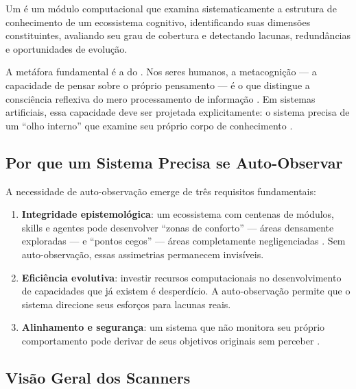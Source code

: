\begin{definicao}
Um  é um módulo computacional que examina
sistematicamente a estrutura de conhecimento de um ecossistema cognitivo,
identificando suas dimensões constituintes, avaliando seu grau de cobertura
e detectando lacunas, redundâncias e oportunidades de evolução.
\end{definicao}

A metáfora fundamental é a do . Nos seres humanos, a
metacognição --- a capacidade de pensar sobre o próprio pensamento --- é o
que distingue a consciência reflexiva do mero processamento de informação
\cite{flavell1976metacognitive, schraw2006metacognitive, metzinger2020minimal}.
Em sistemas artificiais, essa capacidade deve ser projetada explicitamente:
o sistema precisa de um ``olho interno'' que examine seu próprio corpo de
conhecimento \cite{shoham2023multiagent, xi2023rise}.

\subsection{Por que um Sistema Precisa se Auto-Observar}

A necessidade de auto-observação emerge de três requisitos fundamentais:

\begin{enumerate}
\item \textbf{Integridade epistemológica}: um ecossistema com centenas de
módulos, skills e agentes pode desenvolver ``zonas de conforto'' --- áreas
densamente exploradas --- e ``pontos cegos'' --- áreas completamente
negligenciadas \cite{kuhn1998estrutura}. Sem auto-observação, essas
assimetrias permanecem invisíveis.
\item \textbf{Eficiência evolutiva}: investir recursos computacionais no
desenvolvimento de capacidades que já existem é desperdício. A auto-observação
permite que o sistema direcione seus esforços para lacunas reais.
\item \textbf{Alinhamento e segurança}: um sistema que não monitora seu
próprio comportamento pode derivar de seus objetivos originais sem
perceber \cite{russell2020inteligencia, christiano2017deep}.
\end{enumerate}

\subsection{Visão Geral dos Scanners}

